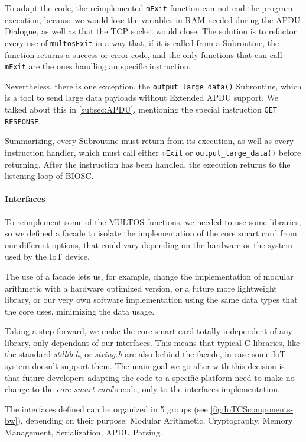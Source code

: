 To adapt the code, the reimplemented \texttt{mExit} function can not end the program execution, because we would lose the variables in RAM needed during the APDU Dialogue, as well as that the TCP socket would close. The solution is to refactor every use of \texttt{multosExit} in a way that, if it is called from a Subroutine, the function returns a success or error code, and the only functions that can call \texttt{mExit} are the ones handling an specific instruction.

Nevertheless, there is one exception, the \texttt{output\_large\_data()} Subroutine, which is a tool to send large data payloads without Extended APDU support. We talked about this in \ref{subsec:APDU}, mentioning the special instruction \texttt{GET RESPONSE}.

Summarizing, every Subroutine must return from its execution, as well as every instruction handler, which must call either \texttt{mExit} or \texttt{output\_large\_data()} before returning. After the instruction has been handled, the execution returns to the listening loop of BIOSC.



\paragraph{Interfaces}\hfil

To reimplement some of the MULTOS functions, we needed to use some libraries, so we defined a facade to isolate the implementation of the core smart card from our different options, that could vary depending on the hardware or the system used by the IoT device.

The use of a facade lets us, for example, change the implementation of modular arithmetic with a hardware optimized version, or a future more lightweight library, or our very own software implementation using the same data types that the core uses, minimizing the data usage.

Taking a step forward, we make the core smart card totally independent of any library, only dependant of our interfaces. This means that typical C libraries, like the standard \textit{stdlib.h}, or  \textit{string.h} are also behind the facade, in case some IoT system doesn't support them. The main goal we go after with this decision is that future developers adapting the code to a specific platform need to make no change to the \textit{core smart card}'s code, only to the interfaces implementation.

The interfaces defined can be organized in 5 groups (see \autoref{fig:IoTCScomponents-bw}), depending on their purpose: Modular Arithmetic, Cryptography, Memory Management, Serialization, APDU Parsing.


